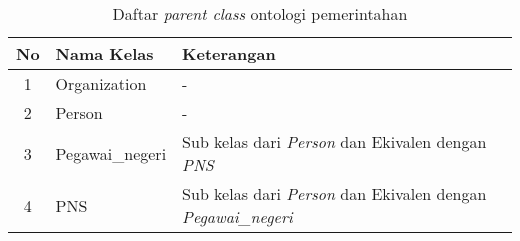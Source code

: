 \begin{table}[hb]
	\caption{Daftar \emph{parent class} ontologi pemerintahan}
	\label{table:parent_class_onogov}
	\begin{tabularx}{\textwidth}{|c|l|X|}
		\hline
			\textbf{No} & \textbf{Nama Kelas} & \textbf{Keterangan} \\
		\hline
			1 & Organization & - \\
		\hline
			2 & Person & - \\
		\hline
			3 & Pegawai\_negeri & Sub kelas dari \emph{Person} dan Ekivalen dengan \emph{PNS} \\
		\hline
			4 & PNS & Sub kelas dari \emph{Person} dan Ekivalen dengan \emph{Pegawai\_negeri} \\
		\hline
	\end{tabularx}
\end{table}

